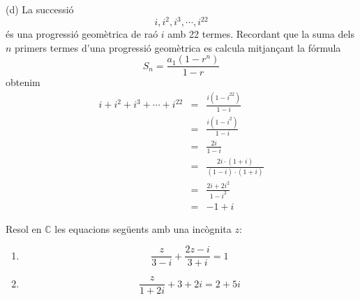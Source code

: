 \begin{solucio}
(d) La successió
\begin{equation*}
i,i^{2},i^{3},\cdots ,i^{22}
\end{equation*}
és una progressió geomètrica de raó $i$ amb 22 termes.
Recordant que la suma dels $n$ primers termes d’una progressió geomètrica es calcula mitjançant la fórmula
\begin{equation*}
S_{n}=\frac{a_{1}(1-r^{n})}{1-r}
\end{equation*}
obtenim
\begin{eqnarray*}
i+i^{2}+i^{3}+\cdots +i^{22} &=&\frac{i(1-i^{22})}{1-i} \\
&=&\frac{i(1-i^{2})}{1-i} \\
&=&\frac{2i}{1-i} \\
&=&\frac{2i\cdot (1+i)}{(1-i)\cdot (1+i)} \\
&=&\frac{2i+2i^{2}}{1-i^{2}} \\
&=&-1+i
\end{eqnarray*}
\end{solucio}

\begin{exemple}
Resol en $\mathbb{C}$ les equacions següents amb una incògnita $z$:

\begin{enumerate}
\item[a)]
\begin{equation*}
\frac{z}{3-i}+\frac{2z-i}{3+i}=1
\end{equation*}

\item[b)]
\begin{equation*}
\frac{z}{1+2i}+3+2i=2+5i
\end{equation*}
\end{enumerate}
\end{exemple}

